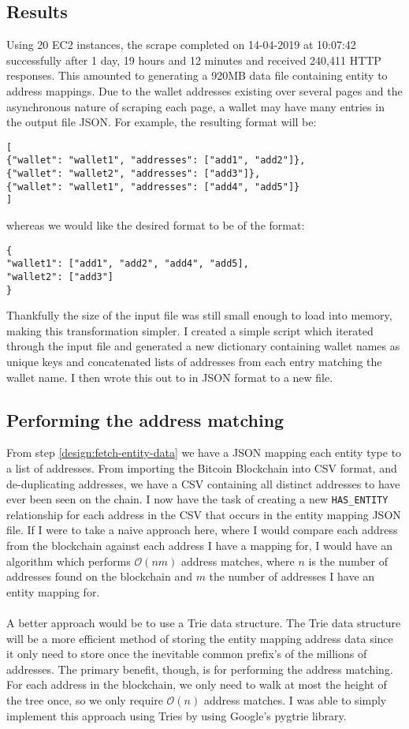 \subsection{Results}
Using 20 EC2 instances, the scrape completed on 14-04-2019 at 10:07:42 successfully after 1 day, 19 hours and 12 minutes and received 240,411 HTTP responses. This amounted to generating a 920MB data file containing entity to address mappings. Due to the wallet addresses existing over several pages and the asynchronous nature of scraping each page, a wallet may have many entries in the output file JSON. For example, the resulting format will be:

\begin{lstlisting}
[
{"wallet": "wallet1", "addresses": ["add1", "add2"]},
{"wallet": "wallet2", "addresses": ["add3"]},
{"wallet": "wallet1", "addresses": ["add4", "add5"]}
]
\end{lstlisting}

whereas we would like the desired format to be of the format:

\begin{lstlisting}
{
"wallet1": ["add1", "add2", "add4", "add5],
"wallet2": ["add3"]
}
\end{lstlisting}
Thankfully the size of the input file was still small enough to load into memory, making this transformation simpler. I created a simple script which iterated through the input file and generated a new dictionary containing wallet names as unique keys and concatenated lists of addresses from each entry matching the wallet name. I then wrote this out to in JSON format to a new file. 

\subsection{Performing the address matching} 
From step \ref{design:fetch-entity-data} we have a JSON mapping each entity type to a list of addresses. From importing the Bitcoin Blockchain into CSV format, and de-duplicating addresses, we have a CSV containing all distinct addresses to have ever been seen on the chain. I now have the task of creating a new \texttt{HAS\_ENTITY} relationship for each address in the CSV that occurs in the entity mapping JSON file. If I were to take a naive approach here, where I would compare each address from the blockchain against each address I have a mapping for, I would have an algorithm which performs $\mathcal{O}(nm)$ address matches, where $n$ is the number of addresses found on the blockchain and $m$ the number of addresses I have an entity mapping for. 
\\\\
A better approach would be to use a Trie data structure. The Trie data structure will be a more efficient method of storing the entity mapping address data since it only need to store once the inevitable common prefix's of the millions of addresses. The primary benefit, though, is for performing the address matching. For each address in the blockchain, we only need to walk at most the height of the tree once, so we only require $\mathcal{O}(n)$ address matches. I was able to simply implement this approach using Tries by using Google's pygtrie library. 